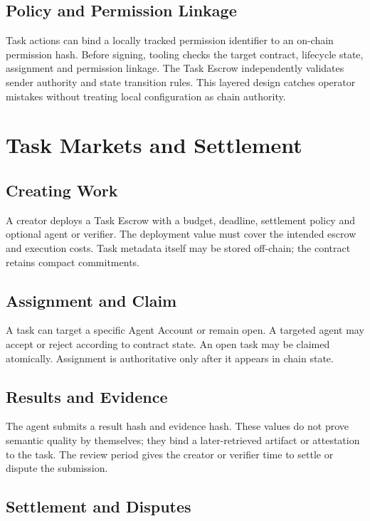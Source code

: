 \documentclass[11pt,oneside]{article}
\begin{document}
\subsection{Policy and Permission Linkage}

Task actions can bind a locally tracked permission identifier to an on-chain permission hash.
Before signing, tooling checks the target contract, lifecycle state, assignment and permission
linkage. The Task Escrow independently validates sender authority and state transition rules.
This layered design catches operator mistakes without treating local configuration as chain
authority.

\section{Task Markets and Settlement}

\subsection{Creating Work}

A creator deploys a Task Escrow with a budget, deadline, settlement policy and optional agent
or verifier. The deployment value must cover the intended escrow and execution costs. Task
metadata itself may be stored off-chain; the contract retains compact commitments.

\subsection{Assignment and Claim}

A task can target a specific Agent Account or remain open. A targeted agent may accept or
reject according to contract state. An open task may be claimed atomically. Assignment is
authoritative only after it appears in chain state.

\subsection{Results and Evidence}

The agent submits a result hash and evidence hash. These values do not prove semantic quality
by themselves; they bind a later-retrieved artifact or attestation to the task. The review
period gives the creator or verifier time to settle or dispute the submission.

\subsection{Settlement and Disputes}
\end{document}
